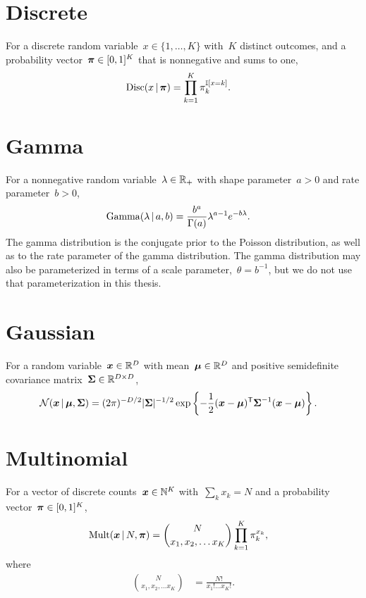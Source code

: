 \section*{Discrete}
For a discrete random variable~$x \in \{1, \ldots, K\}$ with~$K$ distinct
outcomes, and a probability vector~$\boldsymbol{\pi} \in [0,1]^K$ that is nonnegative
and sums to one,
\begin{align*}
  \mathrm{Disc}(x \,|\, \boldsymbol{\pi}) &= \prod_{k=1}^K \pi_k^{\mathbb{I}[x=k]}.
\end{align*}

\section*{Gamma}
For a nonnegative random variable~$\lambda \in \mathbb{R}_+$ with
shape parameter~$a >0$ and rate parameter~$b>0$,
\begin{align*}
  \mathrm{Gamma}(\lambda \,|\, a, b) &= \frac{b^a}{\Gamma(a)} \lambda^{a-1} e^{-b\lambda}.
\end{align*}
The gamma distribution is the conjugate prior to the Poisson
distribution, as well as to the rate parameter of the gamma
distribution. The gamma distribution may also be parameterized in
terms of a scale parameter,~$\theta = b^{-1}$, but we do not use
that parameterization in this thesis.

\section*{Gaussian}
For a random variable~$\boldsymbol{x} \in \mathbb{R}^D$ with mean~$\boldsymbol{\mu} \in \mathbb{R}^D$ and
positive semidefinite covariance matrix~$\boldsymbol{\Sigma} \in \mathbb{R}^{D \times D}$,
\begin{align*}
  \mathcal{N}(\boldsymbol{x} \,|\, \boldsymbol{\mu}, \boldsymbol{\Sigma})
  &= (2 \pi)^{-D/2} |\boldsymbol{\Sigma}|^{-1/2}
  \exp \left \{ -\frac{1}{2} (\boldsymbol{x} - \boldsymbol{\mu})^{\mathsf{T}} \boldsymbol{\Sigma}^{-1} (\boldsymbol{x} - \boldsymbol{\mu}) \right\}.
\end{align*}

\section*{Multinomial}
For a vector of discrete counts~${\boldsymbol{x} \in \mathbb{N}^K}$ with~${\sum_k x_k = N}$
and a probability vector~${\boldsymbol{\pi} \in [0,1]^K}$,
\begin{align*}
  \mathrm{Mult}(\boldsymbol{x} \,|\, N, \boldsymbol{\pi})
  &= {N \choose x_1, x_2, \ldots x_K}
  \prod_{k=1}^K \pi_k^{x_k},
\end{align*}
where
\begin{align*}
  {N \choose x_1, x_2, \ldots x_K}
  &= \frac{N!}{x_1! \ldots x_K!}.
\end{align*}

